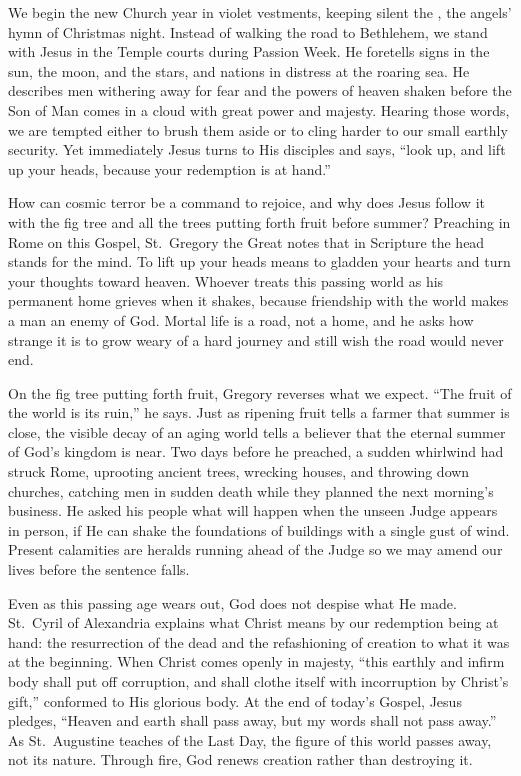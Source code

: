 We begin the new Church year in violet vestments, keeping silent the , the angels' hymn of Christmas night. Instead of walking the road to Bethlehem, we stand with Jesus in the Temple courts during Passion Week. He foretells signs in the sun, the moon, and the stars, and nations in distress at the roaring sea. He describes men withering away for fear and the powers of heaven shaken before the Son of Man comes in a cloud with great power and majesty. Hearing those words, we are tempted either to brush them aside or to cling harder to our small earthly security. Yet immediately Jesus turns to His disciples and says, ``look up, and lift up your heads, because your redemption is at hand.''

How can cosmic terror be a command to rejoice, and why does Jesus follow it with the fig tree and all the trees putting forth fruit before summer? Preaching in Rome on this Gospel, St.~Gregory the Great notes that in Scripture the head stands for the mind. To lift up your heads means to gladden your hearts and turn your thoughts toward heaven. Whoever treats this passing world as his permanent home grieves when it shakes, because friendship with the world makes a man an enemy of God. Mortal life is a road, not a home, and he asks how strange it is to grow weary of a hard journey and still wish the road would never end.

On the fig tree putting forth fruit, Gregory reverses what we expect. ``The fruit of the world is its ruin,'' he says. Just as ripening fruit tells a farmer that summer is close, the visible decay of an aging world tells a believer that the eternal summer of God's kingdom is near. Two days before he preached, a sudden whirlwind had struck Rome, uprooting ancient trees, wrecking houses, and throwing down churches, catching men in sudden death while they planned the next morning's business. He asked his people what will happen when the unseen Judge appears in person, if He can shake the foundations of buildings with a single gust of wind. Present calamities are heralds running ahead of the Judge so we may amend our lives before the sentence falls.

Even as this passing age wears out, God does not despise what He made. St.~Cyril of Alexandria explains what Christ means by our redemption being at hand: the resurrection of the dead and the refashioning of creation to what it was at the beginning. When Christ comes openly in majesty, ``this earthly and infirm body shall put off corruption, and shall clothe itself with incorruption by Christ's gift,'' conformed to His glorious body. At the end of today's Gospel, Jesus pledges, ``Heaven and earth shall pass away, but my words shall not pass away.'' As St.~Augustine teaches of the Last Day, the figure of this world passes away, not its nature. Through fire, God renews creation rather than destroying it.

